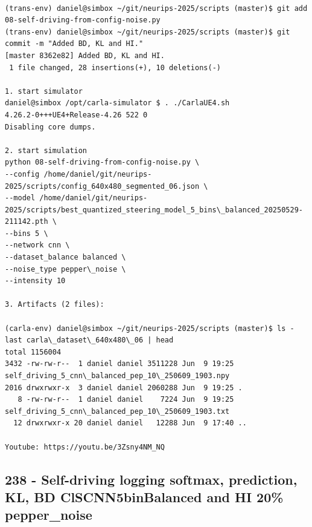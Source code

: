 \begin{verbatim}

(trans-env) daniel@simbox ~/git/neurips-2025/scripts (master)$ git add 08-self-driving-from-config-noise.py 
(trans-env) daniel@simbox ~/git/neurips-2025/scripts (master)$ git commit -m "Added BD, KL and HI."
[master 8362e82] Added BD, KL and HI.
 1 file changed, 28 insertions(+), 10 deletions(-)

1. start simulator
daniel@simbox /opt/carla-simulator $ . ./CarlaUE4.sh 
4.26.2-0+++UE4+Release-4.26 522 0
Disabling core dumps.

2. start simulation
python 08-self-driving-from-config-noise.py \
--config /home/daniel/git/neurips-2025/scripts/config_640x480_segmented_06.json \
--model /home/daniel/git/neurips-2025/scripts/best_quantized_steering_model_5_bins\_balanced_20250529-211142.pth \
--bins 5 \
--network cnn \
--dataset_balance balanced \
--noise_type pepper\_noise \
--intensity 10

3. Artifacts (2 files):

(carla-env) daniel@simbox ~/git/neurips-2025/scripts (master)$ ls -last carla\_dataset\_640x480\_06 | head
total 1156004
3432 -rw-rw-r--  1 daniel daniel 3511228 Jun  9 19:25 self_driving_5_cnn\_balanced_pep_10\_250609_1903.npy
2016 drwxrwxr-x  3 daniel daniel 2060288 Jun  9 19:25 .
   8 -rw-rw-r--  1 daniel daniel    7224 Jun  9 19:25 self_driving_5_cnn\_balanced_pep_10\_250609_1903.txt
  12 drwxrwxr-x 20 daniel daniel   12288 Jun  9 17:40 ..

Youtube: https://youtu.be/3Zsny4NM_NQ

\end{verbatim}

\subsection{238 - Self-driving logging softmax, prediction, KL, BD ClSCNN5binBalanced and HI 20\% pepper\_noise}
\label{app_res:238}

